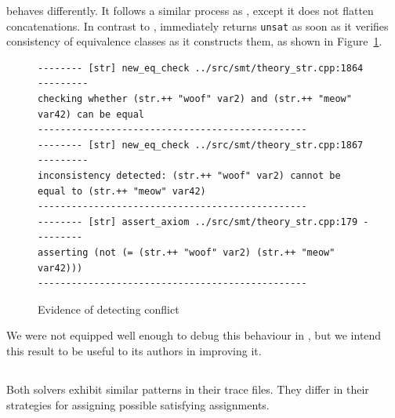         \us{} behaves differently. It follows a similar process as \cvc{}, except it does not flatten concatenations. In contrast to \cvc{}, \us{} immediately returns \texttt{unsat} as soon as it verifies consistency of equivalence classes as it constructs them, as shown in Figure~\ref{fig:z3str3-conflict}.

        \begin{figure}[h]
            {\scriptsize\begin{verbatim}
-------- [str] new_eq_check ../src/smt/theory_str.cpp:1864 ---------
checking whether (str.++ "woof" var2) and (str.++ "meow" var42) can be equal
------------------------------------------------
-------- [str] new_eq_check ../src/smt/theory_str.cpp:1867 ---------
inconsistency detected: (str.++ "woof" var2) cannot be equal to (str.++ "meow" var42)
------------------------------------------------
-------- [str] assert_axiom ../src/smt/theory_str.cpp:179 ---------
asserting (not (= (str.++ "woof" var2) (str.++ "meow" var42)))
------------------------------------------------\end{verbatim}}
            \caption{Evidence of \us{} detecting conflict}
            \label{fig:z3str3-conflict}
        \end{figure}

        We were not equipped well enough to debug this behaviour in \cvc{}, but we intend this result to be useful to its authors in improving it.

    \subsection{\zHard{}}

        Both solvers exhibit similar patterns in their trace files. They differ in their strategies for assigning possible satisfying assignments.

